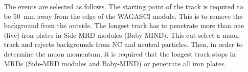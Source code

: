 The events are selected as follows.
The starting point of the track is required to be 50~mm away from the edge of the WAGASCI module. This is to remove the background from the outside.
The longest track has to penetrate more than one (five) iron plates in Side-MRD modules (Baby-MIND).
This cut select a muon track and rejects backgrounds from NC and neutral particles.
Then, in order to determine the muon momentum, it is required that the longest track stops in MRDs (Side-MRD modules and Baby-MIND) or penetrate all iron plates.



